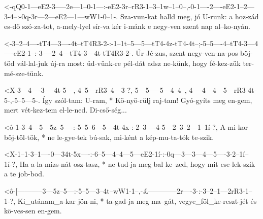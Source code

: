 




  {<-qQ0-1---eE2-3-----2e---1--0-1---:-eE2-3r--rR3-1--3--1w--1--0--,-0-1----2----eE2-1--2---3-4--:-0q-3r---2---eE2---1---wW1-0--1-.}
  {  Sza-vun-kat halld meg, jó U-runk: a   hoz-zád es-dő szó-za-tot, a-mely-lyel sír-va kér i-mánk e  negy-ven szent nap al--ko-nyán.}


  {<-3--2--4----tT4---3----4t--tT4R3-2-:-1--1t--5---5---tT4-4z-tT4-4t--;-5--5----4--tT4-3---4----eE2-1--:-3----2--4---tT4-3---4t-tT4R3-2-.}
  {  Úr Jé-zus, szent negy-ven-na-pos    böj-töd vál-lal-juk új-ra most: üd-vünk-re pél-dát adsz ne-künk, hogy fé-kez-zük ter-mé-sze-tünk.}

  {<X-3---4----3----4t-5---,-4--5---rR3--4---3-?,-5---5-----5---4--4--,-4----4---4---5---rR3-4t-5-,-5--5---5-.}
  {   Így szól-tam: U-ram, * Kö-nyö-rülj raj-tam! Gyó-gyíts meg en-gem, mert vét-kez-tem el-le-ned. Di-cső-ség...}



  {<ô-1-3--4---5---5z--5----:-5--5--6---5---4t-4x-:-2--3----4-5---2--3--2---1--1í-?,}
  {   A-mi-kor böj-töl-tök, * ne le-gye-tek bú-sak, mi-ként a kép-mu-ta-tók te-szik.}


  {<X-1--1-3--1----0---34t-5x----:-6--5---4--4---5---eE2-1í-:-0q---3---3---4---5----3-2--1í--1í-?,}
  {   Ha a-la-mizs-nát osz-tasz, * ne tud-ja meg bal ke--zed, hogy mit cse-lek-szik a te job-bod.}



  {<ô-[-----------3---5z--5---:-5--5---3--4t--wW1-1--,-£------------2r----3-:-3--2--1---2rR3-1--1-?,}
  {   Ki_utánam_a-kar jön-ni, * ta-gad-ja meg ma--gát, vegye_föl_ke-reszt-jét és kö-ves-sen  en-gem.}


